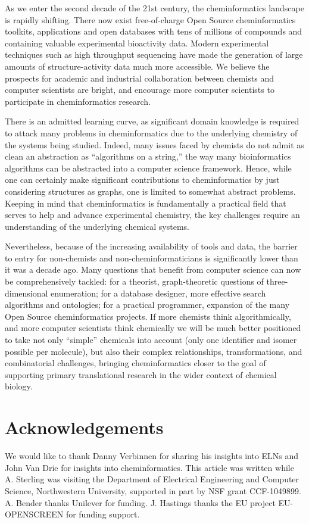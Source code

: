 \documentclass{../sig-alternate}
\begin{document}
As we enter the second decade of the 21st century, the cheminformatics
landscape is rapidly shifting.  There now exist free-of-charge Open
Source cheminformatics toolkits, applications and open databases with
tens of millions of compounds and containing valuable experimental
bioactivity data. Modern experimental techniques such as high
throughput sequencing have made the generation of large amounts of
structure-activity data much more accessible.  We believe the
prospects for academic and industrial collaboration between chemists
and computer scientists are bright, and encourage more computer
scientists to participate in cheminformatics research.

There is an admitted learning curve, as significant domain
knowledge is required to attack many problems in cheminformatics due
to the underlying chemistry of the systems being studied. Indeed, many
issues faced by chemists do not admit as clean an abstraction as
``algorithms on a string,'' the way many bioinformatics algorithms can
be abstracted into a computer science framework.  Hence, while
one can certainly make significant contributions to cheminformatics by
just considering structures as graphs, one is limited to somewhat
abstract problems. Keeping in mind that cheminformatics is
fundamentally a practical field that serves to help and advance
experimental chemistry, the key challenges require an understanding of
the underlying chemical systems.

Nevertheless, because of the increasing availability of tools and
data, the barrier to entry for non-chemists and non-cheminformaticians
is significantly lower than it was a decade ago. Many questions that
benefit from computer science can now be comprehensively tackled: for
a theorist, graph-theoretic questions of three-dimensional
enumeration; for a database designer, more effective search algorithms
and ontologies; for a practical programmer, expansion of the many
Open Source cheminformatics projects.  If more chemists think
algorithmically, and more computer scientists think chemically we will be
much better positioned to take not only ``simple'' chemicals into
account (only one identifier and isomer possible per molecule), but
also their complex relationships, transformations, and combinatorial
challenges, bringing cheminformatics closer to the goal of supporting 
primary translational research in the wider context of chemical biology.

\section{Acknowledgements}
We would like to thank Danny Verbinnen for sharing his insights into
ELNs and John Van Drie for insights into cheminformatics.  This
article was written while A. Sterling was visiting the Department of
Electrical Engineering and Computer Science, Northwestern University,
supported in part by NSF grant CCF-1049899. A. Bender thanks Unilever
for funding. J. Hastings thanks the EU project EU-OPENSCREEN for
funding support.
\end{document}
